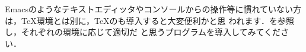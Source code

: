 Emacsのようなテキストエディッタやコンソールからの操作等に慣れていない方
は，\TeX 環境とは別に，\TeX のも導入すると大変便利かと思
われます．を参照し，それぞれの環境に応じて適切だ
と思うプログラムを導入してみてください．








